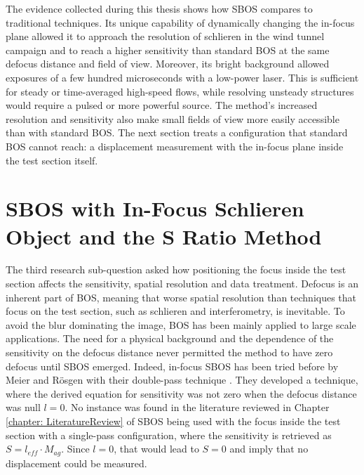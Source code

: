 The evidence collected during this thesis shows how SBOS compares to traditional techniques. Its unique capability of dynamically changing the in-focus plane allowed it to approach the resolution of schlieren in the wind tunnel campaign and to reach a higher sensitivity than standard BOS at the same defocus distance and field of view. Moreover, its bright background allowed exposures of a few hundred microseconds with a low-power laser. This is sufficient for steady or time-averaged high-speed flows, while resolving unsteady structures would require a pulsed or more powerful source. The method's increased resolution and sensitivity also make small fields of view more easily accessible than with standard BOS. The next section treats a configuration that standard BOS cannot reach: a displacement measurement with the in-focus plane inside the test section itself.

\section{SBOS with In-Focus Schlieren Object and the S Ratio Method}
\label{section: In-focus SBOS}

The third research sub-question asked how positioning the focus inside the test section affects the sensitivity, spatial resolution and data treatment. Defocus is an inherent part of BOS, meaning that worse spatial resolution than techniques that focus on the test section, such as schlieren and interferometry, is inevitable. To avoid the blur dominating the image, BOS has been mainly applied to large scale applications. The need for a physical background and the dependence of the sensitivity on the defocus distance never permitted the method to have zero defocus until SBOS emerged. Indeed, in-focus SBOS has been tried before by Meier and Rösgen with their double-pass technique \cite{Meier&Roesgen2013}. They developed a technique, where the derived equation for sensitivity was not zero when the defocus distance was null $l = 0$. No instance was found in the literature reviewed in Chapter \ref{chapter: LiteratureReview} of SBOS being used with the focus inside the test section with a single-pass configuration, where the sensitivity is retrieved as $S = l_{eff}\cdot M_{ag}$. Since $l = 0$, that would lead to $S = 0$ and imply that no displacement could be measured.

